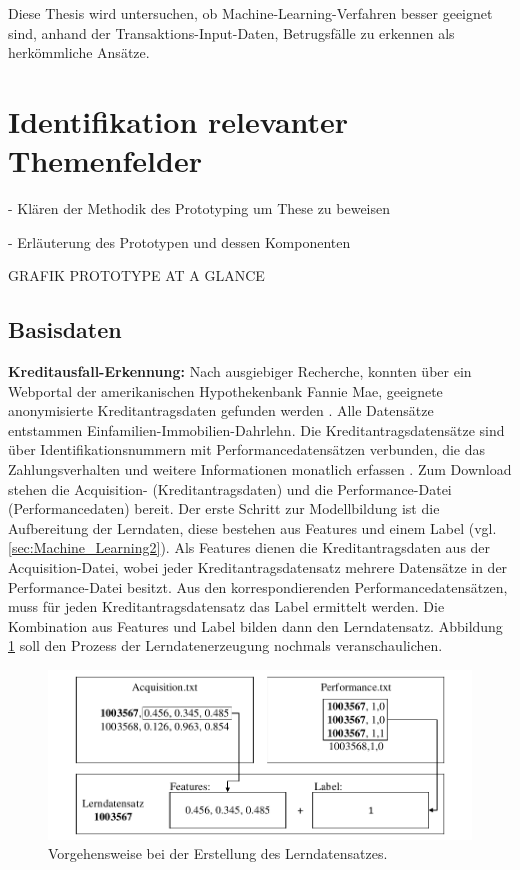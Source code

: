 Diese Thesis wird untersuchen, ob Machine-Learning-Verfahren besser geeignet sind, anhand der Transaktions-Input-Daten, Betrugsfälle zu erkennen als herkömmliche Ansätze. 

\section{Identifikation relevanter Themenfelder}
\label{subsec:Themenfelder3}

- Klären der Methodik des Prototyping um These zu beweisen

- Erläuterung des Prototypen und dessen Komponenten 
 
GRAFIK PROTOTYPE AT A GLANCE

\subsection{Basisdaten}
\label{subsec:Basisdaten3}

\textbf{Kreditausfall-Erkennung:} Nach ausgiebiger Recherche, konnten über ein Webportal der amerikanischen Hypothekenbank Fannie Mae, geeignete anonymisierte Kreditantragsdaten gefunden werden \cite{FM17}. Alle Datensätze entstammen Einfamilien-Immobilien-Dahrlehn. Die Kreditantragsdatensätze sind über Identifikationsnummern mit Performancedatensätzen verbunden, die das Zahlungsverhalten und weitere Informationen monatlich erfassen \cite{FM18}. Zum Download stehen die Acquisition- (Kreditantragsdaten) und die Performance-Datei (Performancedaten) bereit. Der erste Schritt zur Modellbildung ist die Aufbereitung der Lerndaten, diese bestehen aus Features und einem Label (vgl. \ref{sec:Machine_Learning2}).     
Als Features dienen die Kreditantragsdaten aus der Acquisition-Datei, wobei jeder Kreditantragsdatensatz mehrere Datensätze in der Performance-Datei besitzt. Aus den korrespondierenden Performancedatensätzen, muss für jeden Kreditantragsdatensatz das Label ermittelt werden. Die Kombination aus Features und Label bilden dann den Lerndatensatz. Abbildung \ref{fig:cleansing} soll den Prozess der Lerndatenerzeugung nochmals veranschaulichen.

\begin{figure}[ht]
\centering
\includegraphics{images/cleansing.pdf}
\caption{Vorgehensweise bei der Erstellung des Lerndatensatzes.}
\label{fig:cleansing}
\end{figure}  

